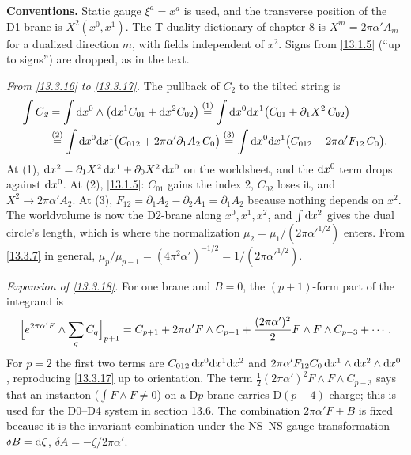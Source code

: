 \begin{tcolorbox}[breakable]
	\begin{remark}
		\textbf{Conventions.} Static gauge $\xi^a=x^a$ is used, and the transverse position of the D1-brane is $X^2(x^0,x^1)$. The T-duality dictionary of chapter 8 is $X^m=2\pi\alpha'A_m$ for a dualized direction $m$, with fields independent of $x^2$. Signs from \eqref{13.1.5} (``up to signs'') are dropped, as in the text.

		\textit{From \eqref{13.3.16} to \eqref{13.3.17}.} The pullback of $C_2$ to the tilted string is
		\begin{align*}
			\int C_{\textit{2}} &= \int \mathrm{d} x^0\wedge\bigl(\mathrm{d} x^1C_{01}+\mathrm{d} x^2C_{02}\bigr) \overset{(1)}{=} \int\mathrm{d} x^0\mathrm{d} x^1\bigl(C_{01}+\partial_1X^2\,C_{02}\bigr)\\
			&\overset{(2)}{=} \int\mathrm{d} x^0\mathrm{d} x^1\bigl(C_{012}+2\pi\alpha'\partial_1A_2\,C_0\bigr) \overset{(3)}{=} \int\mathrm{d} x^0\mathrm{d} x^1\bigl(C_{012}+2\pi\alpha'F_{12}\,C_0\bigr).
		\end{align*}
		At (1), $\mathrm{d} x^2=\partial_1X^2\,\mathrm{d} x^1+\partial_0X^2\,\mathrm{d} x^0$ on the worldsheet, and the $\mathrm{d} x^0$ term drops against $\mathrm{d} x^0$. At (2), \eqref{13.1.5}: $C_{01}$ gains the index 2, $C_{02}$ loses it, and $X^2\to2\pi\alpha'A_2$. At (3), $F_{12}=\partial_1A_2-\partial_2A_1=\partial_1A_2$ because nothing depends on $x^2$. The worldvolume is now the D2-brane along $x^0,x^1,x^2$, and $\int\mathrm{d} x^2$ gives the dual circle's length, which is where the normalization $\mu_2=\mu_1/(2\pi\alpha'^{1/2})$ enters. From \eqref{13.3.7} in general, $\mu_p/\mu_{p-1}=(4\pi^2\alpha')^{-1/2}=1/(2\pi\alpha'^{1/2})$.

		\textit{Expansion of \eqref{13.3.18}.} For one brane and $B=0$, the $(p+1)$-form part of the integrand is
		\begin{align*}
			\Bigl[e^{2\pi\alpha'F}\wedge\sum_qC_q\Bigr]_{p+1} = C_{p+1} + 2\pi\alpha'F\wedge C_{p-1} + \frac{(2\pi\alpha')^2}{2}F\wedge F\wedge C_{p-3} + \cdots .
		\end{align*}
		For $p=2$ the first two terms are $C_{012}\,\mathrm{d} x^0\mathrm{d} x^1\mathrm{d} x^2$ and $2\pi\alpha'F_{12}C_0\,\mathrm{d} x^1\wedge\mathrm{d} x^2\wedge\mathrm{d} x^0$, reproducing \eqref{13.3.17} up to orientation. The term $\frac12(2\pi\alpha')^2F\wedge F\wedge C_{p-3}$ says that an instanton ($\int F\wedge F\neq0$) on a D$p$-brane carries D$(p-4)$ charge; this is used for the D0--D4 system in section 13.6. The combination $2\pi\alpha'F+B$ is fixed because it is the invariant combination under the NS--NS gauge transformation $\delta B=\mathrm{d}\zeta$, $\delta A=-\zeta/2\pi\alpha'$.
	\end{remark}
\end{tcolorbox}

